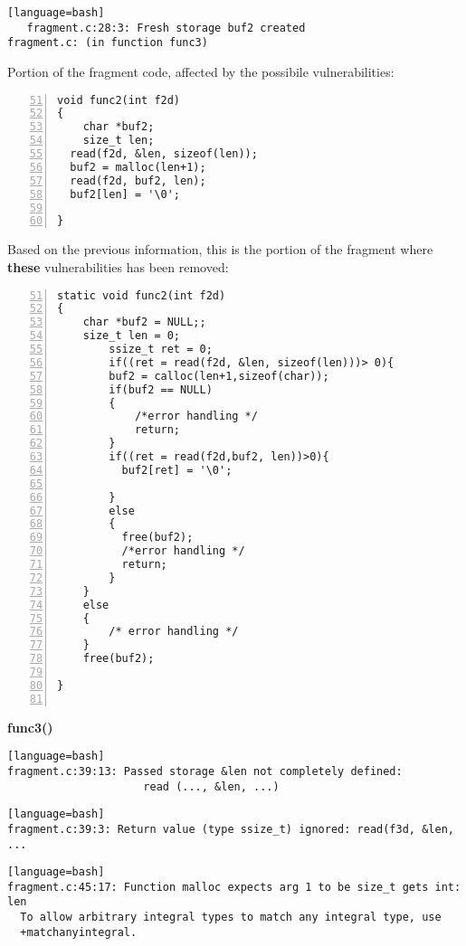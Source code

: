 \documentclass[a4paper,12pt]{article}
\begin{document}
\begin{lstlisting}[style=DOS][language=bash]
   fragment.c:28:3: Fresh storage buf2 created
fragment.c: (in function func3)
\end{lstlisting}


Portion of the fragment code, affected by the possibile vulnerabilities:
\begin{lstlisting}[style=c,numbers=left,firstnumber=51,linebackgroundcolor={
\ifnum\value{lstnumber}=54\color{red}\fi
\ifnum\value{lstnumber}=55\color{red}\fi
\ifnum\value{lstnumber}=58\color{red}\fi
}]
void func2(int f2d)
{
	char *buf2;
	size_t len;
  read(f2d, &len, sizeof(len));
  buf2 = malloc(len+1); 
  read(f2d, buf2, len); 
  buf2[len] = '\0';

}

\end{lstlisting}

\noindent
Based on the previous information, this is the portion of the fragment where \textbf{these} vulnerabilities has been removed:
\begin{lstlisting}[style=c,numbers=left,firstnumber=51,linebackgroundcolor={
\ifnum\value{lstnumber}=56\color{green}\fi
\ifnum\value{lstnumber}=66\color{green}\fi}]
static void func2(int f2d)
{
	char *buf2 = NULL;;
	size_t len = 0;
        ssize_t ret = 0;
        if((ret = read(f2d, &len, sizeof(len)))> 0){
  		buf2 = calloc(len+1,sizeof(char));
		if(buf2 == NULL)
		{
			/*error handling */
			return;
		} 
  		if((ret = read(f2d,buf2, len))>0){ 
  		  buf2[ret] = '\0';
		  
		}
		else
		{
		  free(buf2);
		  /*error handling */
		  return;
		}
	}
	else
	{
		/* error handling */
	}
	free(buf2);

}


\end{lstlisting}


\noindent
\textbf{func3()}\\

   
\begin{lstlisting}[style=DOS][language=bash]
fragment.c:39:13: Passed storage &len not completely defined:
                     read (..., &len, ...)
\end{lstlisting}


\begin{lstlisting}[style=DOS][language=bash]
fragment.c:39:3: Return value (type ssize_t) ignored: read(f3d, &len, ...
\end{lstlisting}

\begin{lstlisting}[style=DOS][language=bash]
fragment.c:45:17: Function malloc expects arg 1 to be size_t gets int: len
  To allow arbitrary integral types to match any integral type, use
  +matchanyintegral.
\end{lstlisting}
\end{document}
